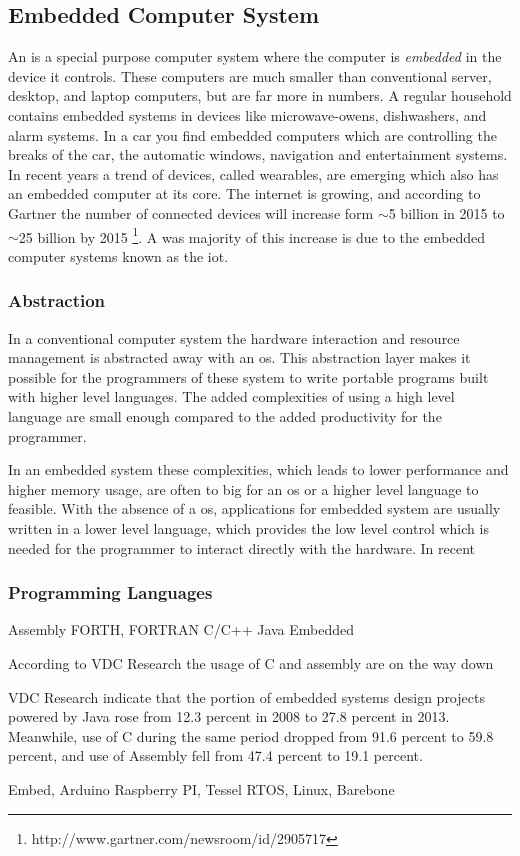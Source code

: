 
\subsection{Embedded Computer System}
An  is a special purpose computer system where the computer is \emph{embedded} in the device it controls.
These computers are much smaller than conventional server, desktop, and laptop computers, but are far more in numbers.
A regular household contains embedded systems in devices like microwave-owens, dishwashers, and alarm systems.
In a car you find embedded computers which are controlling the breaks of the car, the automatic windows, navigation and entertainment systems.
In recent years a trend of devices, called wearables, are emerging which also has an embedded computer at its core.
The internet is growing, and according to Gartner the number of connected devices will increase form $\sim$5 billion in 2015 to $\sim$25 billion by 2015 \footnote{http://www.gartner.com/newsroom/id/2905717}.
A was majority of this increase is due to the embedded computer systems known as the \gls{iot}.

\subsubsection{Abstraction}
In a conventional computer system the hardware interaction and resource management is abstracted away with an \gls{os}.
This abstraction layer makes it possible for the programmers of these system to write portable programs built with higher level languages.
The added complexities of using a high level language are small enough compared to the added productivity for the programmer.

In an embedded system these complexities, which leads to lower performance and higher memory usage, are often to big for an \gls{os} or a higher level language to feasible.
With the absence of a \gls{os}, applications for embedded system are usually written in a lower level language, which provides the low level control which is needed for the programmer to interact directly with the hardware.
In recent

\subsubsection{Programming Languages}


Assembly
FORTH, FORTRAN
C/C++
Java Embedded

According to VDC Research the usage of C and assembly are on the way down

VDC Research indicate that the portion of embedded systems design projects powered by Java rose from 12.3 percent in 2008 to 27.8 percent in 2013. Meanwhile, use of C during the same period dropped from 91.6 percent to 59.8 percent, and use of Assembly fell from 47.4 percent to 19.1 percent.



Embed, Arduino
Raspberry PI, Tessel
RTOS, Linux, Barebone
